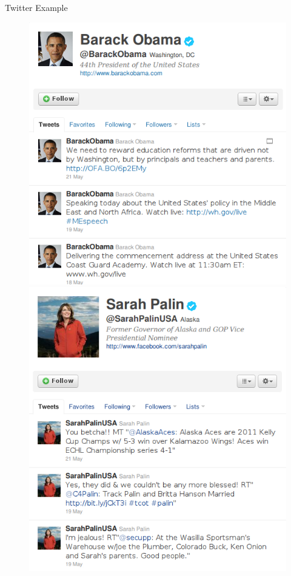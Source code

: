 \documentclass{beamer}
\begin{document}
\begin{frame}{Twitter Example}
  \begin{figure}[!ht]
   \centering
   \includegraphics[scale=.3]{pres3.png}
   \includegraphics[scale=.3]{pres4.png}
 \end{figure}
\end{frame}
\end{document}
